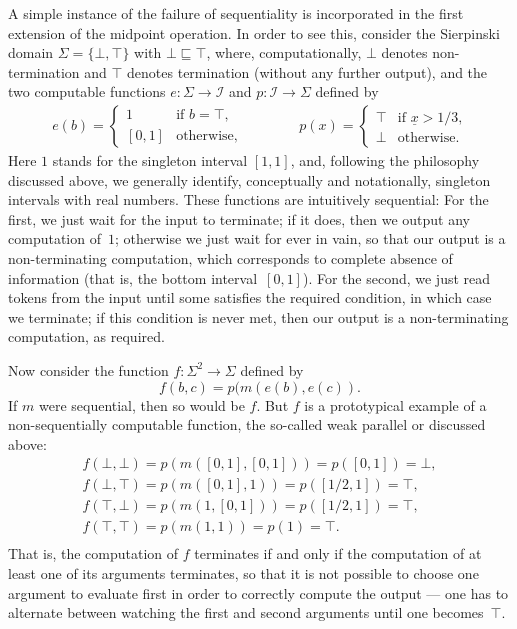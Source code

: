 \documentclass[12pt]{article}
\newcommand{\I}{\mathcal{I}}
\begin{document}
A simple instance of the failure of sequentiality is incorporated in
the first extension of the midpoint operation. In order to see this,
consider the Sierpinski domain $\Sigma = \{ \bot,\top \}$ with $\bot
\sqsubseteq \top$, where, computationally, $\bot$ denotes
non-termination and $\top$ denotes termination (without any further
output), and the two computable functions
$e:\Sigma \to \I$ and $p: \I \to \Sigma$ defined by
\begin{gather*}
e(b) = \begin{cases}
1 & \text{if $b=\top$,} \\
[0,1] & \text{otherwise,}
\end{cases} \qquad\qquad
p(x)  =  \begin{cases}
\top & \text{if $\underline{x} > 1/3$,} \\
\bot & \text{otherwise.}  
\end{cases} 
\end{gather*}
Here $1$ stands for the singleton interval $[1,1]$, and, following the
philosophy discussed above, we generally identify, conceptually and
notationally, singleton intervals with real numbers.  These functions
are intuitively sequential: For the first, we just wait for the input
to terminate; if it does, then we output any computation of~$1$;
otherwise we just wait for ever in vain, so that our output is a
non-terminating computation, which corresponds to complete absence of
information (that is, the bottom interval~$[0,1]$). For the second, we
just read tokens from the input until some satisfies the required
condition, in which case we terminate; if this condition is never
met, then our output is a non-terminating computation, as required.

Now consider the function $f:\Sigma^2 \to \Sigma$ defined by
\[
f(b,c) = p(m(e(b),e(c)).
\]
If $m$ were sequential, then so would be $f$. But $f$ is a
prototypical example of a non-sequentially computable function, the
so-called weak parallel or discussed above:
\begin{gather*}
  f(\bot,\bot) = p(m([0,1],[0,1])) = p([0,1]) = \bot, \\
  f(\bot,\top) = p(m([0,1],1)) = p([1/2,1]) = \top,  \\
  f(\top,\bot) = p(m(1,[0,1])) = p([1/2,1]) = \top, \\
  f(\top,\top) = p(m(1,1)) = p(1) = \top. \\
\end{gather*}
That is, the computation of $f$ terminates if and only if the
computation of at least one of its arguments terminates, so that it is
not possible to choose one argument to evaluate first in order to
correctly compute the output --- one has to alternate between watching
the first and second arguments until one becomes~$\top$.
\end{document}
